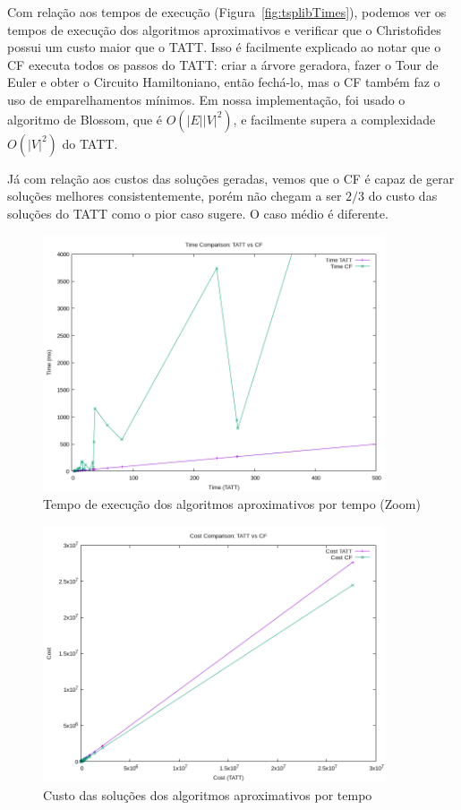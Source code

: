 \documentclass[12pt]{article}
\begin{document}
Com relação aos tempos de execução (Figura~\ref{fig:tsplibTimes}), podemos ver os tempos de execução dos algoritmos
aproximativos e verificar que o Christofides possui um custo maior que o TATT.
Isso é facilmente explicado ao notar que o CF executa todos os passos do TATT:
criar a árvore geradora, fazer o Tour de Euler e obter o Circuito Hamiltoniano,
então fechá-lo, mas o CF também faz o uso de emparelhamentos mínimos. Em nossa
implementação, foi usado o algoritmo de Blossom, que é $O(|E||V|^2)$, e facilmente
supera a complexidade $O(|V|^2)$ do TATT.

Já com relação aos custos das soluções geradas, vemos que o CF é capaz de gerar
soluções melhores consistentemente, porém não chegam a ser $2/3$ do custo das
soluções do TATT como o pior caso sugere. O caso médio é diferente.

\begin{figure}
\centering
\includegraphics[width=0.9\textwidth]{tsplib_plot_times_zoom.png}
\caption{Tempo de execução dos algoritmos aproximativos por tempo (Zoom)}
\label{fig:tsplibTimesZoom}
\end{figure}

\begin{figure}
\centering
\includegraphics[width=0.9\textwidth]{tsplib_plot_costs.png}
\caption{Custo das soluções dos algoritmos aproximativos por tempo}
\label{fig:tsplibCosts}
\end{figure}
\end{document}
